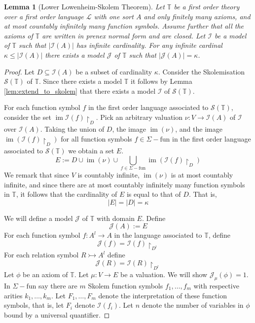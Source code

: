 \documentclass[12pt]{article}
\theoremstyle{plain}
\newtheorem{lemma}[thm]{Lemma}
\theoremstyle{definition}
\newcommand{\bb}[1]{\mathbb{#1}}
\newcommand{\call}[1]{\mathcal{#1}}
\newcommand{\lto}{\longrightarrow}
\begin{document}
\begin{lemma}[Lower Lowenheim-Skolem Theorem]\label{lem:lower}
	Let $\bb{T}$ be a first order theory over a first order language $\call{L}$ with one sort $A$ and only finitely many axioms, and at most countably infinitely many function symbols. Assume further that all the axioms of $\bb{T}$ are written in prenex normal form and are closed. Let $\call{I}$ be a model of $\bb{T}$ such that $|\call{I}(A)|$ has infinite cardinality. For any infinite cardinal $\kappa \leq |\call{I}(A)|$ there exists a model $\call{J}$ of $\bb{T}$ such that $|\call{J}(A)| = \kappa$.
	\end{lemma}
\begin{proof}
	Let $D \subseteq \call{I}(A)$ be a subset of cardinality $\kappa$. Consider the Skolemisation $\call{S}(\bb{T})$ of $\bb{T}$. Since there exists a model $\bb{T}$ it follows by Lemma \ref{lem:extend_to_skolem} that there exists a model $\call{I}$ of $\call{S}(\bb{T})$.
	
For each function symbol $f$ in the first order language associated to $\call{S}(\bb{T})$, consider the set $\operatorname{im}\call{I}(f)\restriction_{D}$. Pick an arbitrary valuation $\nu: V \lto \call{I}(A)$ of $\call{I}$ over $\call{I}(A)$. Taking the union of $D$, the image $\operatorname{im}(\nu)$, and the image $\operatorname{im}(\call{I}(f)\restriction_D)$ for all function symbols $f \in \Sigma-\text{fun}$ in the first order language associated to $\call{S}(\bb{T})$ we obtain a set $E$.
	\begin{equation}
		E := D \cup \operatorname{im}(\nu) \cup \bigcup_{f \in \Sigma-\text{fun}}\operatorname{im}(\call{I}(f)\restriction_D)
	\end{equation}
We remark that since $V$ is countably infinite, $\operatorname{im}(\nu)$ is at most countably infinite, and since there are at most countably infinitely many function symbols in $\bb{T}$, it follows that the cardinality of $E$ is equal to that of $D$. That is,
\begin{equation}
	|E| = |D| = \kappa
	\end{equation}

	We will define a model $\call{J}$ of $\bb{T}$ with domain $E$. Define
	\begin{equation}
		\call{J}(A) := E
	\end{equation}
	For each function symbol $f: A^l \lto A$ in the language associated to $\bb{T}$, define
	\begin{equation}
		\call{J}(f) = \call{I}(f)\restriction_{D^l}
	\end{equation}
	For each relation symbol $R \rightarrowtail A^l$ define
	\begin{equation}
		\call{J}(R) = \call{I}(R)\restriction_{D^l}
	\end{equation}
Let $\phi$ be an axiom of $\bb{T}$. Let $\mu: V \lto E$ be a valuation. We will show $\call{J}_\mu(\phi) = 1$. In $\Sigma-\text{fun}$ say there are $m$ Skolem function symbols $f_1,\ldots, f_m$ with respective arities $k_1, \ldots, k_m$. Let $F_1, \ldots, F_m$ denote the interpretation of these function symbols, that is, let $F_i$ denote $\call{I}(f_i)$. Let $n$ denote the number of variables in $\phi$ bound by a universal quantifier.


\end{proof}
\end{document}
